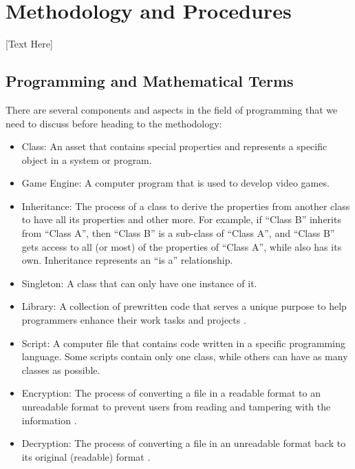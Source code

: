 
\section{Methodology and Procedures}

[Text Here]

\subsection{Programming and Mathematical Terms}
There are several components and aspects in the field of programming that we need to discuss before heading to the methodology:
\begin{itemize}
    \item {Class: An asset that contains special properties and represents a specific object in a system or program.}
    
    \item{Game Engine: A computer program that is used to develop video games.}
    
    \item{Inheritance: The process of a class to derive the properties from another class to have all its properties and other more. For example, if “Class B” inherits from “Class A”, then “Class B” is a sub-class of “Class A”, and “Class B” gets access to all (or most) of the properties of “Class A”, while also has its own. Inheritance represents an “is a” relationship.}
    
    \item{Singleton: A class that can only have one instance of it.}
    
    \item{Library: A collection of prewritten code that serves a unique purpose to help programmers enhance their work tasks and projects \cite{LibraryDef}.}
    
    \item{Script: A computer file that contains code written in a specific programming language. Some scripts contain only one class, while others can have as many classes as possible.}
    
    \item{Encryption: The process of converting a file in a readable format to an unreadable format to prevent users from reading and tampering with the information \cite{EncryptionAndDecryption}.}
    
    \item{Decryption: The process of converting a file in an unreadable format back to its original (readable) format \cite{EncryptionAndDecryption}.}
    

\end{itemize}
